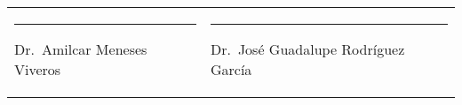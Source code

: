 \documentclass[12pt,letterpaper,spanish]{article}
\begin{document}
\begin{tabular}{lp{6cm}}
\begin{minipage}[t][3cm][s]{0.4\textwidth}
    \hrule
	\vspace*{3mm}
\centering
   Dr.\ Amilcar Meneses Viveros
\end{minipage} & \quad \quad
\begin{minipage}[t][3cm][s]{0.5\textwidth}
    \hrule
	\vspace*{3mm}
\centering
   Dr.\ José Guadalupe Rodríguez García
\end{minipage}

\end{tabular}

\end{document}
